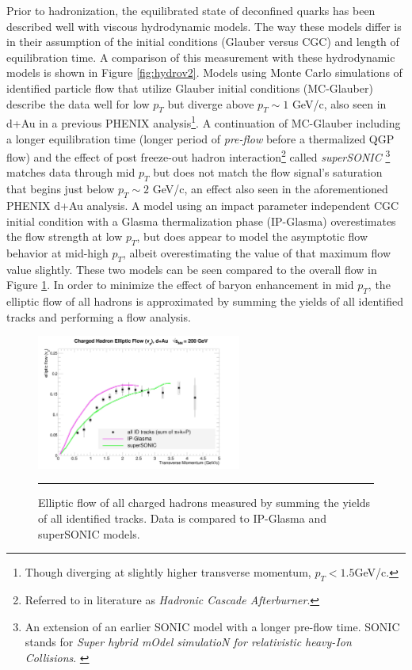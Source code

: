 Prior to hadronization, the equilibrated state of deconfined quarks has been described well with viscous hydrodynamic models. The way these models differ is in their assumption of the initial conditions (Glauber versus CGC) and length of equilibration time. A comparison of this measurement with these hydrodynamic models is shown in Figure \ref{fig:hydrov2}. Models using Monte Carlo simulations of identified particle flow that utilize Glauber initial conditions (MC-Glauber) describe the data well for low $p_T$ but diverge above $p_T \sim 1$ GeV/c, also seen in d+Au in a previous PHENIX analysis\footnote{Though diverging at slightly higher transverse momentum, $p_T < 1.5 $GeV/c.}. \citep{Adare:2014keg} A continuation of MC-Glauber including a longer equilibration time (longer period of \textit{pre-flow} before a thermalized QGP flow) and the effect of post freeze-out hadron interaction\footnote{Referred to in literature as \textit{Hadronic Cascade Afterburner}.} called \textit{superSONIC} \citep{Romatschke2015}\footnote{An extension of an earlier SONIC model with a longer pre-flow time. SONIC stands for \textit{Super hybrid mOdel simulatioN for relativistic heavy-Ion Collisions}. \citep{Romatschke2015}} matches data through mid $p_T$ but does not match the flow signal's saturation that begins just below $p_T \sim 2$ GeV/c, an effect also seen in the aforementioned PHENIX d+Au analysis. A model using an impact parameter independent CGC initial condition with a Glasma thermalization phase (IP-Glasma) \citep{Schenke:2014gaa} overestimates the flow strength at low $p_T$, but does appear to model the asymptotic flow behavior at mid-high $p_T$, albeit overestimating the value of that maximum flow value slightly. These two models can be seen compared to the overall flow in Figure \ref{fig:allhadronhydro}. In order to minimize the effect of baryon enhancement in mid $p_T$, the elliptic flow of all hadrons is approximated by summing the yields of all identified tracks and performing a flow analysis. 

\begin{figure}[h]
\centering    
    \includegraphics[width=0.6\textwidth]{results/v2hydro.jpg}
    \rule{35em}{0.5pt}
    \caption[Elliptic flow of all charged hadrons compared to hydrodynamic models.]{Elliptic flow of all charged hadrons measured by summing the yields of all identified tracks. Data is compared to IP-Glasma and superSONIC models.}
    \label{fig:allhadronhydro}
\end{figure}


